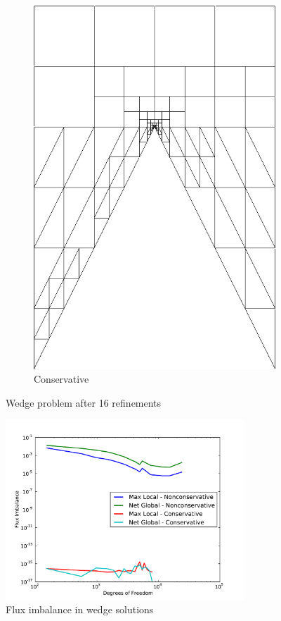 \documentclass[letterpaper]{article}
\begin{document}
\begin{figure}[p]
\begin{subfigure}[t]{0.4\textwidth}
\includegraphics[width=\textwidth]{figs/Wedge/modified16c_mesh.png}
\caption{Conservative}
\label{fig:wedgeRobust16nc}
\end{subfigure}
\caption{Wedge problem after 16 refinements}
\label{fig:wedge}
\end{figure}

\begin{figure}[p]
\centering
\includegraphics[width=0.8\textwidth]{figs/Wedge/modifiedFlux.pdf}
\caption{Flux imbalance in wedge solutions}
\label{fig:wedge_flux}
\end{figure}
\end{document}
